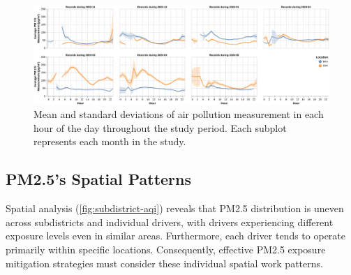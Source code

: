 \begin{figure}
    \centering
    \includegraphics[width=\textwidth]{figures/average-hourly-pollution.pdf}%
    \caption{Mean and standard deviations of air pollution measurement in each hour of the day throughout the study period.
    Each subplot represents each month in the study. }%
    \Description{}
    \label{fig:hourly-work-aqi}%
\end{figure}%



\subsection{PM2.5's Spatial Patterns}

Spatial analysis (\autoref{fig:subdistrict-aqi}) reveals that PM2.5 distribution is uneven across subdistricts and individual drivers, with drivers experiencing different exposure levels even in similar areas.
Furthermore, each driver tends to operate primarily within specific locations.
Consequently, effective PM2.5 exposure mitigation strategies must consider these individual spatial work patterns.

